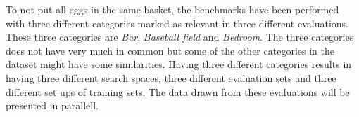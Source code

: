 To not put all eggs in the same basket, the benchmarks have been performed with three different categories marked as relevant in three different evaluations. These three categories are \emph{Bar}, \emph{Baseball field} and \emph{Bedroom}. The three categories does not have very much in common but some of the other categories in the dataset might have some similarities. Having three different categories results in having three different search spaces, three different evaluation sets and three different set ups of training sets. The data drawn from these evaluations will be presented in parallell. 

